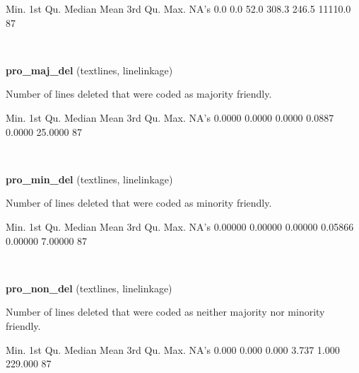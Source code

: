 \documentclass[]{article}
\newenvironment{Shaded}{\begin{snugshade}}{\end{snugshade}}
\newcommand{\StringTok}[1]{\textcolor[rgb]{0.31,0.60,0.02}{{#1}}}
\newcommand{\NormalTok}[1]{{#1}}
\begin{document}
\begin{Shaded}
\begin{Highlighting}[]
   \NormalTok{Min. 1st Qu.  Median    Mean 3rd Qu.    Max.    NA}\StringTok{'s }
\StringTok{    0.0     0.0    52.0   308.3   246.5 11110.0      87 }
\end{Highlighting}
\end{Shaded}

~

\vspace{1em}

\textbf{pro\_maj\_del} (textlines, linelinkage)

Number of lines deleted that were coded as majority friendly.

\begin{Shaded}
\begin{Highlighting}[]
   \NormalTok{Min. 1st Qu.  Median    Mean 3rd Qu.    Max.    NA}\StringTok{'s }
\StringTok{ 0.0000  0.0000  0.0000  0.0887  0.0000 25.0000      87 }
\end{Highlighting}
\end{Shaded}

~

\vspace{1em}

\textbf{pro\_min\_del} (textlines, linelinkage)

Number of lines deleted that were coded as minority friendly.

\begin{Shaded}
\begin{Highlighting}[]
   \NormalTok{Min. 1st Qu.  Median    Mean 3rd Qu.    Max.    NA}\StringTok{'s }
\StringTok{0.00000 0.00000 0.00000 0.05866 0.00000 7.00000      87 }
\end{Highlighting}
\end{Shaded}

~

\vspace{1em}

\textbf{pro\_non\_del} (textlines, linelinkage)

Number of lines deleted that were coded as neither majority nor minority
friendly.

\begin{Shaded}
\begin{Highlighting}[]
   \NormalTok{Min. 1st Qu.  Median    Mean 3rd Qu.    Max.    NA}\StringTok{'s }
\StringTok{  0.000   0.000   0.000   3.737   1.000 229.000      87 }
\end{Highlighting}
\end{Shaded}
\end{document}
